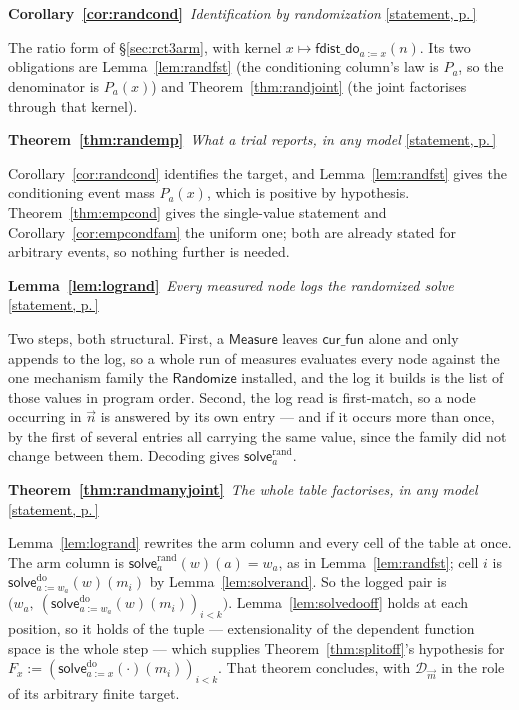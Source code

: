 \documentclass[11pt,a4paper]{article}
\theoremstyle{definition}
\theoremstyle{plain}
\theoremstyle{remark}
\newcommand{\dom}{\mathcal{D}}
\newcommand{\solve}{\mathsf{solve}}
\newcommand{\solvedo}{\solve^{\mathrm{do}}}
\newcommand{\fdo}{\mathsf{fdist\_do}}
\newenvironment{proofof}[3]{%
  \par\medskip\phantomsection\label{pf:#1}%
  \noindent\textbf{#2~\ref{#1}}\ \emph{#3}\quad
  \hyperref[#1]{\small[statement, p.\,\pageref{#1}]}\par\nobreak
  \noindent\ignorespaces}{\par}
\begin{document}
\begin{proofof}{cor:randcond}{Corollary}{Identification by randomization}
The ratio form of \S\ref{sec:rct3arm}, with kernel
$x \mapsto \fdo_{a := x}(n)$. Its two obligations are
Lemma~\ref{lem:randfst} (the conditioning column's law is $P_a$, so the
denominator is $P_a(x)$) and Theorem~\ref{thm:randjoint} (the joint
factorises through that kernel).
\end{proofof}

\begin{proofof}{thm:randemp}{Theorem}{What a trial reports, in any model}
Corollary~\ref{cor:randcond} identifies the target, and
Lemma~\ref{lem:randfst} gives the conditioning event mass $P_a(x)$, which
is positive by hypothesis. Theorem~\ref{thm:empcond} gives the
single-value statement and Corollary~\ref{cor:empcondfam} the uniform one;
both are already stated for arbitrary events, so nothing further is
needed.
\end{proofof}

\begin{proofof}{lem:logrand}{Lemma}{Every measured node logs the randomized solve}
Two steps, both structural. First, a $\mathsf{Measure}$ leaves
$\mathsf{cur\_fun}$ alone and only appends to the log, so a whole run of
measures evaluates every node against the one mechanism family the
$\mathsf{Randomize}$ installed, and the log it builds is the list of those
values in program order. Second, the log read is first-match, so a node
occurring in $\vec n$ is answered by its own entry --- and if it occurs
more than once, by the first of several entries all carrying the same
value, since the family did not change between them. Decoding gives
$\solve^{\mathrm{rand}}_a$.
\end{proofof}

\begin{proofof}{thm:randmanyjoint}{Theorem}{The whole table factorises, in any model}
Lemma~\ref{lem:logrand} rewrites the arm column and every cell of the
table at once. The arm column is $\solve^{\mathrm{rand}}_a(w)(a) = w_a$,
as in Lemma~\ref{lem:randfst}; cell $i$ is
$\solvedo_{a := w_a}(w)(m_i)$ by Lemma~\ref{lem:solverand}. So the logged
pair is
$\bigl(w_a,\ (\solvedo_{a := w_a}(w)(m_i))_{i<k}\bigr)$.
Lemma~\ref{lem:solvedooff} holds at each position, so it holds of the
tuple --- extensionality of the dependent function space is the whole
step --- which supplies Theorem~\ref{thm:splitoff}'s hypothesis for
$F_x := (\solvedo_{a := x}(\cdot)(m_i))_{i<k}$. That theorem concludes,
with $\dom_{\vec m}$ in the role of its arbitrary finite target.
\end{proofof}
\end{document}
